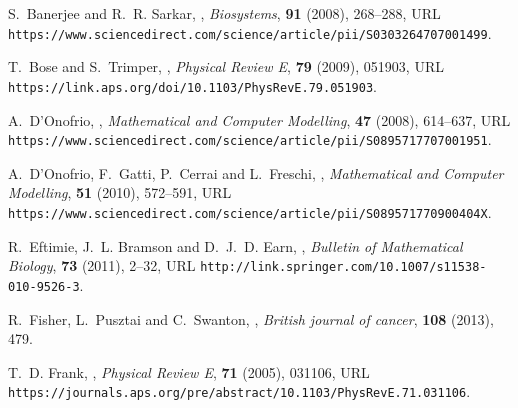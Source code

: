 \documentclass{aims}
\theoremstyle{definition}
\begin{document}
\providecommand{\href}[2]{#2}
\providecommand{\arxiv}[1]{\href{http://arxiv.org/abs/#1}{arXiv:#1}}
\providecommand{\url}[1]{\texttt{#1}}
\providecommand{\urlprefix}{URL }
\begin{thebibliography}{10}

\newblock S.~Banerjee and R.~R. Sarkar,
,
\newblock \emph{Biosystems}, \textbf{91} (2008), 268--288,
\newblock
  \urlprefix\url{https://www.sciencedirect.com/science/article/pii/S0303264707001499}.

\newblock T.~Bose and S.~Trimper,
,
\newblock \emph{Physical Review E}, \textbf{79} (2009), 051903,
\newblock \urlprefix\url{https://link.aps.org/doi/10.1103/PhysRevE.79.051903}.

\newblock A.~D'Onofrio,
,
\newblock \emph{Mathematical and Computer Modelling}, \textbf{47} (2008),
  614--637,
\newblock
  \urlprefix\url{https://www.sciencedirect.com/science/article/pii/S0895717707001951}.

\newblock A.~D'Onofrio, F.~Gatti, P.~Cerrai and L.~Freschi,
,
\newblock \emph{Mathematical and Computer Modelling}, \textbf{51} (2010),
  572--591,
\newblock
  \urlprefix\url{https://www.sciencedirect.com/science/article/pii/S089571770900404X}.

\newblock R.~Eftimie, J.~L. Bramson and D.~J.~D. Earn,
,
\newblock \emph{Bulletin of Mathematical Biology}, \textbf{73} (2011), 2--32,
\newblock \urlprefix\url{http://link.springer.com/10.1007/s11538-010-9526-3}.

\newblock R.~Fisher, L.~Pusztai and C.~Swanton,
,
\newblock \emph{British journal of cancer}, \textbf{108} (2013), 479.

\newblock T.~D. Frank,
,
\newblock \emph{Physical Review E}, \textbf{71} (2005), 031106,
\newblock
  \urlprefix\url{https://journals.aps.org/pre/abstract/10.1103/PhysRevE.71.031106}.


\end{thebibliography}
\end{document}

